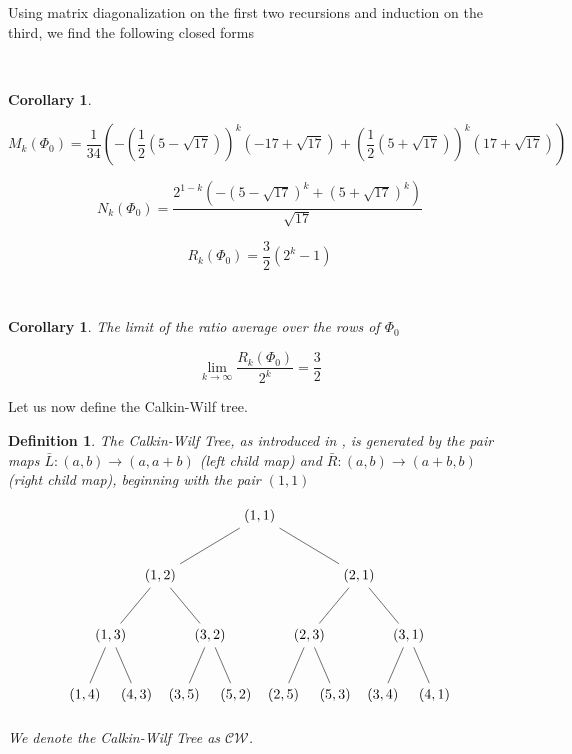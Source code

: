 \documentclass{article}
\newtheorem{definition}[theorem]{Definition}  %
\newtheorem{corollary}[theorem]{Corollary}  %
\begin{document}
Using matrix diagonalization on the first two recursions and induction on the third, we find the following closed forms

\

\begin{corollary}\label{closed_forms}

\[
M_k(\Phi_0) = 
\frac{1}{34} \left(-\left(\frac{1}{2} \left(5 - \sqrt{17}\right)\right)^k \left(-17 + \sqrt{17}\right) + \left(\frac{1}{2} \left(5 + \sqrt{17}\right)\right)^k \left(17 + \sqrt{17}\right)\right)
\]

\[
N_k(\Phi_0) = 
\frac{2^{1 - k} \left(-\left(5 - \sqrt{17}\right)^k + \left(5 + \sqrt{17}\right)^k\right)}{\sqrt{17}}
\]


\[
R_k(\Phi_0) = \frac{3}{2} \left (2^k - 1 \right)
\]

\end{corollary}

\

\begin{corollary}\label{phi0average}
The limit of the ratio average over the rows of $\Phi_0$

$$\lim_{k \rightarrow \infty} \frac{R_k(\Phi_0)}{2^k} = \frac{3}{2}$$
\end{corollary}


Let us now define the Calkin-Wilf tree. 


\begin{definition}
The Calkin-Wilf Tree, as introduced in \cite{CW}, is generated by the pair maps $\bar{L}:(a, b) \rightarrow (a, a+b)$ (left child map) and $\bar{R}: (a, b) \rightarrow (a+b, b)$ (right child map), beginning with the pair $(1,1)$

$$
\begin{tikzpicture}[level distance=15mm, 
                    level 1/.style={sibling distance=50mm},
                    level 2/.style={sibling distance=25mm},
                    level 3/.style={sibling distance=13mm}]
  \node {\((1, 1)\)}
    child {
      node {\((1, 2)\)} 
      child {
        node {\((1, 3)\)}
        child {node {\((1, 4)\)}}
        child {node {\((4, 3)\)}}
      }
      child {
        node {\((3, 2)\)}
        child {node {\((3, 5)\)}}
        child {node {\((5, 2)\)}}
      }
    }
    child {
      node {\((2, 1)\)}
      child {
        node {\((2, 3)\)}
        child {node {\((2, 5)\)}}
        child {node {\((5, 3)\)}}
      }
      child {
        node {\((3, 1)\)}
        child {node {\((3, 4)\)}}
        child {node {\((4, 1)\)}}
      } 
    };
\end{tikzpicture}$$

We denote the Calkin-Wilf Tree as $\mathcal{CW}$.
\end{definition}
\end{document}
